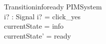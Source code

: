 \begin{schema}{Transitioninfoready}
  \Delta PIMSystem\\
  i? : Signal
\where
  i? = click\_yes \\
  currentState = info \\
  currentState' = ready
\end{schema}

